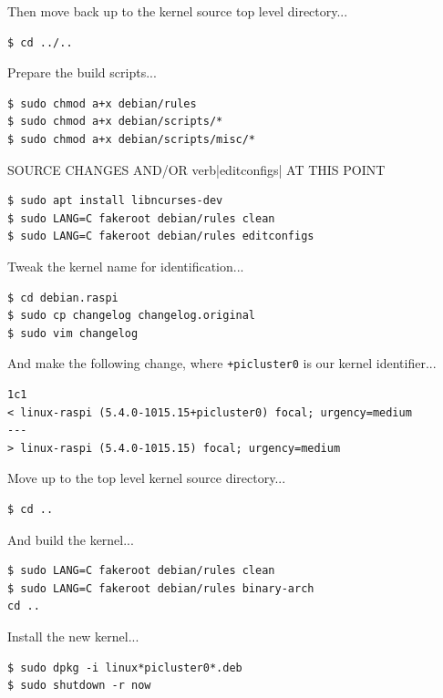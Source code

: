 \documentclass{report}
\begin{document}
Then move back up to the kernel source top level directory...

\lstset{style=type}
\begin{lstlisting}
$ cd ../..
\end{lstlisting}

Prepare the build scripts...

\lstset{style=type}
\begin{lstlisting}
$ sudo chmod a+x debian/rules
$ sudo chmod a+x debian/scripts/*
$ sudo chmod a+x debian/scripts/misc/*
\end{lstlisting}

SOURCE CHANGES AND/OR verb|editconfigs| AT THIS POINT

\lstset{style=type}
\begin{lstlisting}
$ sudo apt install libncurses-dev
$ sudo LANG=C fakeroot debian/rules clean
$ sudo LANG=C fakeroot debian/rules editconfigs
\end{lstlisting}

Tweak the kernel name for identification...

\lstset{style=type}
\begin{lstlisting}
$ cd debian.raspi
$ sudo cp changelog changelog.original
$ sudo vim changelog
\end{lstlisting}

And make the following change, where \verb|+picluster0| is our kernel identifier...

\lstset{style=listing}
\begin{lstlisting}[caption=diff changelog changelog.original, numbers=none]
1c1
< linux-raspi (5.4.0-1015.15+picluster0) focal; urgency=medium
---
> linux-raspi (5.4.0-1015.15) focal; urgency=medium
\end{lstlisting}

Move up to the top level kernel source directory...

\lstset{style=type}
\begin{lstlisting}
$ cd ..
\end{lstlisting}

And build the kernel...

\lstset{style=type}
\begin{lstlisting}
$ sudo LANG=C fakeroot debian/rules clean
$ sudo LANG=C fakeroot debian/rules binary-arch
cd ..
\end{lstlisting}

Install the new kernel...

\lstset{style=type}
\begin{lstlisting}
$ sudo dpkg -i linux*picluster0*.deb
$ sudo shutdown -r now
\end{lstlisting}
\end{document}
